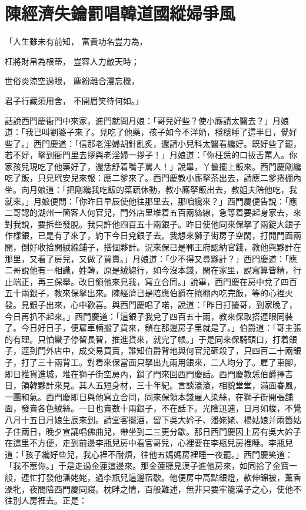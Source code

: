%

\chapter{陳經濟失鑰罰唱\KG 韓道國縱婦爭風}

「人生雖未有前知，  富貴功名豈力為，

枉將財帛為根蒂，  豈容人力敵天時；

世俗炎涼空過眼，  塵紛離合漫忘機，

君子行藏須用舍，  不開眉笑待何如。」

話說西門慶衙門中來家，進門就問月娘：「哥兒好些？使小廝請太醫去？」月娘道：「我已叫劉婆子來了。見吃了他藥，孩子如今不洋奶，穩穩睡了這半日，覺好些了。」西門慶道：「信那老淫婦胡針亂炙，還請小兒科太醫看纔好。既好些了罷，若不好，拏到衙門里去拶與老淫婦一拶子！」月娘道：「你枉恁的口拔舌罵人。你家孩兒現吃了他藥好了，還恁舒着嘴子罵人！」說畢，丫鬟擺上飯來。西門慶剛纔吃了飯，只見玳安兒來報：應二爹來了。西門慶教小廝拏茶出去，請應二爹捲棚內坐。向月娘道：「把剛纔我吃飯的菜蔬休動，教小廝拏飯出去，教姐夫陪他吃，我就來。」月娘便問：「你昨日早辰使他往那里去，那咱纔來？」西門慶便告說：「應二哥認的湖州一箇客人何官兒，門外店里堆着五百兩絲線，急等着要起身家去，來對我說，要拆些發脫。我只許他四百五十兩銀子。昨日使他同來保拏了兩錠大銀子作樣銀，已是有了來了，約下今日兌銀子去。我想來獅子街房子空閑，打開門面兩開，倒好收拾開絨線舖子，搭個夥計。況來保已是鄆王府認納官錢，教他與夥計在那里，又看了房兒，又做了買賣。」月娘道：「少不得又尋夥計？」西門慶道：「應二哥說他有一相識，姓韓，原是絨線行，如今沒本錢，閑在家里，說寫算皆精，行止端正，再三保舉。改日領他來見我，寫立合同。」說畢，西門慶在房中兌了四百五十兩銀子，教來保拏出來。陳經濟已是陪應伯爵在捲棚內吃完飯，等的心裡火發。見銀子出來，心中歡喜。與西門慶唱了喏，說道：「昨日打擾哥，到家晚了，今日再扒不起來。」西門慶道：「這銀子我兌了四百五十兩，教來保取搭連眼同裝了。今日好日子，便雇車輛搬了貨來，鎖在那邊房子里就是了。」伯爵道：「哥主張的有理。只怕蠻子停留長智，推進貨來，就完了帳。」于是同來保騎頭口，打着銀子，逕到門外店中，成交易買賣，誰知伯爵背地與何官兒砸殺了，只四百二十兩銀子，打了三十兩背工。對着來保當面只拏出九兩用銀來，二人均分了。雇了車腳，即日推貨進城，堆在獅子街空房內，鎖了門來回西門慶話。西門慶教恁伯爵擇吉日，領韓夥計來見。其人五短身材，三十年紀。言談滾滾，相貌堂堂，滿面春風，一團和氣。西門慶即日與他寫立合同，同來保領本錢雇人染絲，在獅子街開張舖面，發賣各色絨絲。一日也賣數十兩銀子，不在話下。光陰迅速，日月如梭，不覺八月十五日月娘生辰來到。請堂客擺酒，留下吳大妗子、潘姥姥、楊姑娘并兩箇姑子住兩日，晚夕宣誦唱佛曲兒，帶坐到二三更分歇。那日西門慶因上房有吳大妗子在這里不方便，走到前邊李瓶兒房中看官哥兒，心裡要在李瓶兒房裡睡。李瓶兒道：「孩子纔好些兒，我心裡不耐煩，往他五媽媽房裡睡一夜罷。」西門慶笑道：「我不惹你。」于是走過金蓮這邊來。那金蓮聽見漢子進他房來，如同拾了金寶一般，連忙打發他潘姥姥，過李瓶兒這邊宿歇。他便房中高點銀燈，款伸錦被，薰香澡牝，夜間陪西門慶同寢。枕畔之情，百般難述，無非只要牢籠漢子之心，使他不往別人房裡去。正是：

